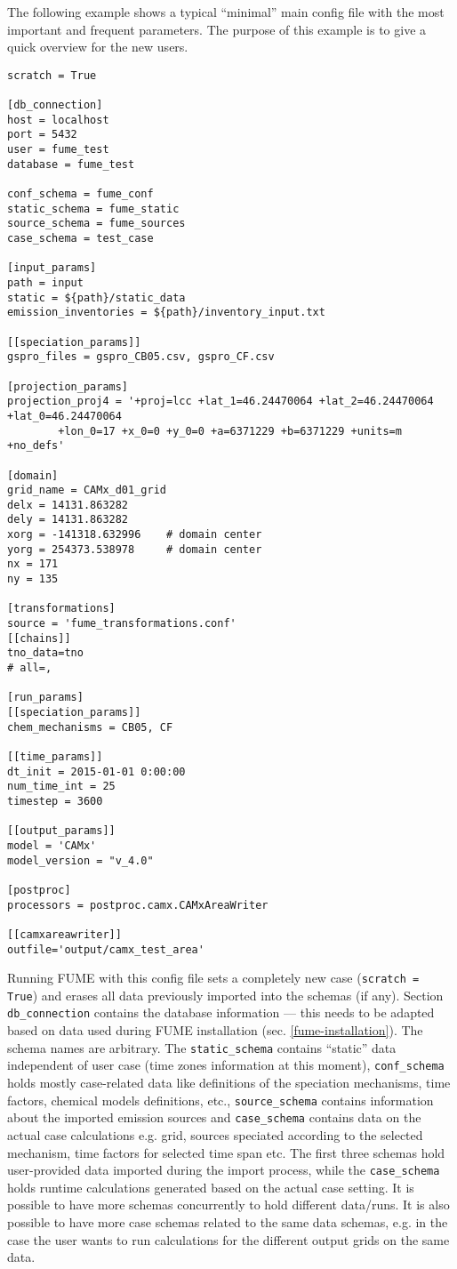 \documentclass[a4paper,11pt]{article}
\begin{document}
The following example shows a typical ``minimal'' main config file with the most important and frequent parameters. The purpose of this example is to give a quick overview for the new users.
\begin{verbatim}
scratch = True

[db_connection]
host = localhost
port = 5432
user = fume_test
database = fume_test

conf_schema = fume_conf
static_schema = fume_static
source_schema = fume_sources
case_schema = test_case

[input_params]
path = input
static = ${path}/static_data
emission_inventories = ${path}/inventory_input.txt

[[speciation_params]]
gspro_files = gspro_CB05.csv, gspro_CF.csv

[projection_params]
projection_proj4 = '+proj=lcc +lat_1=46.24470064 +lat_2=46.24470064 +lat_0=46.24470064 
        +lon_0=17 +x_0=0 +y_0=0 +a=6371229 +b=6371229 +units=m +no_defs'

[domain]
grid_name = CAMx_d01_grid
delx = 14131.863282
dely = 14131.863282
xorg = -141318.632996    # domain center
yorg = 254373.538978     # domain center
nx = 171
ny = 135

[transformations]
source = 'fume_transformations.conf'
[[chains]]
tno_data=tno
# all=,

[run_params]
[[speciation_params]]
chem_mechanisms = CB05, CF

[[time_params]]
dt_init = 2015-01-01 0:00:00
num_time_int = 25
timestep = 3600

[[output_params]]
model = 'CAMx'
model_version = "v_4.0"

[postproc]
processors = postproc.camx.CAMxAreaWriter

[[camxareawriter]]
outfile='output/camx_test_area'    
\end{verbatim}

Running FUME with this config file sets a completely new case (\verb|scratch = True|) and erases all data previously imported into the schemas (if any). Section \verb|db_connection| contains the database information --- this needs to be adapted based on data used during FUME installation (sec. \ref{fume-installation}). The schema names are arbitrary. The \verb|static_schema| contains ``static'' data independent of user case (time zones information at this moment), \verb|conf_schema| holds mostly case-related data like definitions of the speciation mechanisms, time factors, chemical models definitions, etc., \verb|source_schema| contains information about the imported emission sources and \verb|case_schema| contains data on the actual case calculations e.g. grid, sources speciated according to the selected mechanism, time factors for selected time span etc. The first three schemas hold user-provided data imported during the import process, while the \verb|case_schema| holds runtime calculations generated based on the actual case setting. It is possible to have more schemas concurrently to hold different data/runs. It is also possible to have more case schemas related to the same data schemas, e.g. in the case the user wants to run calculations for the different output grids on the same data. 
\end{document}
